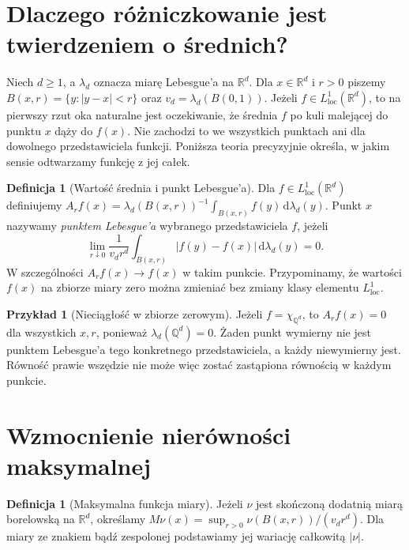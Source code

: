 \documentclass[11pt,a4paper,oneside]{book}
\numberwithin{equation}{chapter}
\theoremstyle{plain}
\theoremstyle{definition}
\newtheorem{definicja}[twierdzenie]{Definicja}
\newtheorem{przyklad}[twierdzenie]{Przykład}
\theoremstyle{remark}
\begin{document}
\section{Dlaczego różniczkowanie jest twierdzeniem o średnich?}
Niech $d\ge1$, a $\lambda_d$ oznacza miarę Lebesgue'a na
$\mathbb R^d$. Dla $x\in\mathbb R^d$ i $r>0$ piszemy
$B(x,r)=\{y:|y-x|<r\}$ oraz $v_d=\lambda_d(B(0,1))$.
Jeżeli $f\in L^1_{\mathrm{loc}}(\mathbb R^d)$, to na pierwszy
rzut oka naturalne jest oczekiwanie, że średnia $f$ po kuli
malejącej do punktu $x$ dąży do $f(x)$. Nie zachodzi to
we wszystkich punktach ani dla dowolnego przedstawiciela
funkcji. Poniższa teoria precyzyjnie określa, w jakim
sensie odtwarzamy funkcję z jej całek.

\begin{definicja}[Wartość średnia i punkt Lebesgue'a]
\label{def:lebesgue-point-25}
Dla $f\in L^1_{\mathrm{loc}}(\mathbb R^d)$ definiujemy
$A_rf(x)=\lambda_d(B(x,r))^{-1}\int_{B(x,r)}f(y)\,\mathrm d\lambda_d(y)$.
Punkt $x$ nazywamy \emph{punktem Lebesgue'a} wybranego
przedstawiciela $f$, jeżeli
\begin{equation}\label{eq:lebesgue-point-25}
 \lim_{r\downarrow0}\frac1{v_dr^d}
 \int_{B(x,r)}|f(y)-f(x)|\,\mathrm d\lambda_d(y)=0.
\end{equation}
W szczególności $A_rf(x)\to f(x)$ w takim punkcie.
Przypominamy, że wartości $f(x)$ na zbiorze miary zero
można zmieniać bez zmiany klasy elementu $L^1_{\mathrm{loc}}$.
\end{definicja}

\begin{przyklad}[Nieciągłość w zbiorze zerowym]
Jeżeli $f=\chi_{\mathbb Q^d}$, to $A_rf(x)=0$ dla
wszystkich $x,r$, ponieważ $\lambda_d(\mathbb Q^d)=0$.
Żaden punkt wymierny nie jest punktem Lebesgue'a tego
konkretnego przedstawiciela, a każdy niewymierny jest.
Równość prawie wszędzie nie może więc zostać zastąpiona
równością w każdym punkcie.
\end{przyklad}

\section{Wzmocnienie nierówności maksymalnej}
\begin{definicja}[Maksymalna funkcja miary]
\label{def:max-measure-25}
Jeżeli $\nu$ jest skończoną dodatnią miarą borelowską
na $\mathbb R^d$, określamy
$M\nu(x)=\sup_{r>0}\nu(B(x,r))/(v_dr^d)$.
Dla miary ze znakiem bądź zespolonej podstawiamy jej
wariację całkowitą $|\nu|$.
\end{definicja}
\end{document}
